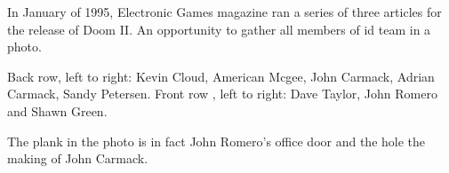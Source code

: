 
\begin{figure}
\end{figure}

In January of 1995, Electronic Games magazine ran a series of three articles for the release of Doom II. An opportunity to gather all members of id team in a photo.\\
\par Back row, left to right: Kevin Cloud, American Mcgee, John Carmack, Adrian Carmack, Sandy Petersen.
 Front row , left to right: Dave Taylor, John Romero and Shawn Green.\\
 \par
  The plank in the photo is in fact John Romero's office door and the hole the making of John Carmack.\\
 \par
{}






